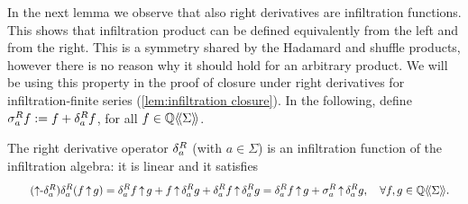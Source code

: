 In the next lemma we observe that also right derivatives are infiltration functions.
This shows that infiltration product can be defined equivalently from the left and from the right.
%
This is a symmetry shared by the Hadamard and shuffle products,
however there is no reason why it should hold for an arbitrary product.
%
We will be using this property in the proof of closure under right derivatives for infiltration-finite series
(\cref{lem:infiltration closure}).
%
In the following, define $\sigma^R_a f := f + \delta^R_{a} f$, for all $f \in \mathbb Q\langle\!\langle\Sigma\rangle\!\rangle$.
%
\begin{lemma}
    \label{lem:derive right infiltration}
    The right derivative operator $\delta^R_{a}$ (with $a \in \Sigma$)
    is an infiltration function of the infiltration algebra:
    it is linear and it satisfies
    \begin{align}
        \label{eq:derive right infiltration}
        \tag{${\infiltration}$-$\deriveright a$}
        \deriveright a (f \infiltration g)
        &= \deriveright a f \infiltration g
            + f \infiltration \deriveright a g
            + \deriveright a f \infiltration \deriveright a g
        = \deriveright a f \infiltration g + \sigma^R_a \infiltration \deriveright a g,
        \quad \forall f, g \in \series \Q \Sigma. %
    \end{align}
\end{lemma}
%
